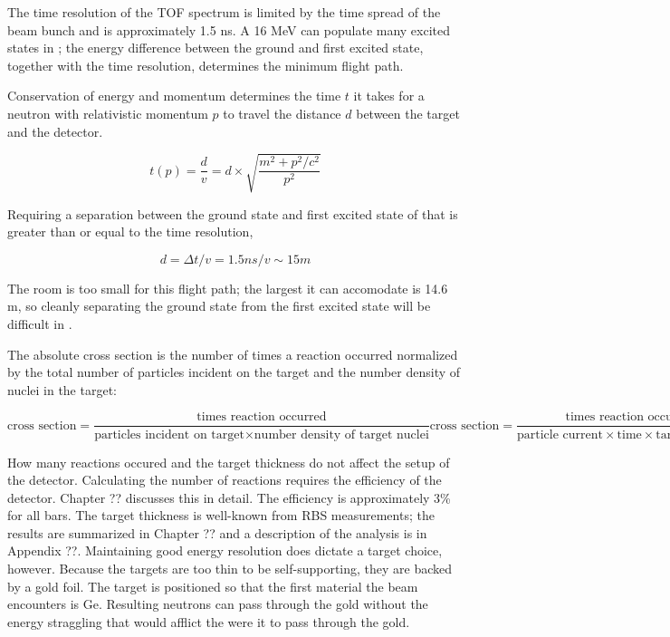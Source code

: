 The time resolution of the TOF spectrum is limited by the time spread of the beam bunch and is approximately 1.5 ns.  A 16 MeV  can populate many excited states in \GeTargets; the energy difference between the ground and first excited state, together with the time resolution, determines the minimum flight path.


Conservation of energy and momentum determines the time $t$ it takes for a neutron with relativistic momentum $p$ to travel the distance $d$ between the target and the detector.

\begin{equation}
t(p) = \frac{d}{v} = d\times\sqrt{\frac{m^2+p^2/c^2}{p^2}}
\label{eq:TOF2}
\end{equation}


Requiring a separation between the ground state and first excited state of  that is greater than or equal to the time resolution,

\begin{equation}
d = \Delta t/v = 1.5 ns / v \sim 15 m
\label{eq:requiredDist}
\end{equation}

The room is too small for this flight path; the largest it can accomodate is 14.6 m, so cleanly separating the ground state from the first excited state will be difficult in \GeTargets.

The absolute cross section is the number of times a reaction occurred normalized by the total number of particles incident on the target and the number density of nuclei in the target:

\begin{equation}
\text{cross section} = \frac{\text{times reaction occurred}}{\text{particles incident on target} \times \text{number density of target nuclei}}

\text{cross section} = \frac{\text{times reaction occurred}}{\text{particle current} \times \text{time} \times \text{target thickness}}
\label{eq:cross_section}
\end{equation}

How many reactions occured and the target thickness do not affect the setup of the detector.  Calculating the number of reactions requires the efficiency of the detector.  Chapter ?? discusses this in detail.  The efficiency is approximately 3\% for all bars.  The target thickness is well-known from RBS measurements; the results are summarized in Chapter ?? and a description of the analysis is in Appendix ??.  Maintaining good energy resolution does dictate a target choice, however.  Because the  targets are too thin to be self-supporting, they are backed by a gold foil.  The target is positioned so that the first material the beam encounters is Ge.  Resulting neutrons can pass through the gold without the energy straggling that would afflict the  were it to pass through the gold.

